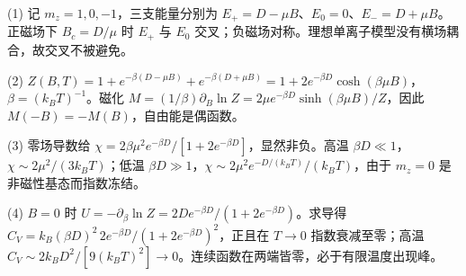(1) 记 \(m_z=1,0,-1\)，三支能量分别为 \(E_+=D-\mu B\)、\(E_0=0\)、\(E_-=D+\mu B\)。正磁场下 \(B_c=D/\mu\) 时 \(E_+\) 与 \(E_0\) 交叉；负磁场对称。理想单离子模型没有横场耦合，故交叉不被避免。

(2) \(Z(B,T)=1+e^{-\beta(D-\mu B)}+e^{-\beta(D+\mu B)}=1+2e^{-\beta D}\cosh(\beta\mu B)\)，\(\beta=(k_BT)^{-1}\)。磁化 \(M=(1/\beta)\partial_B\ln Z=2\mu e^{-\beta D}\sinh(\beta\mu B)/Z\)，因此 \(M(-B)=-M(B)\)，自由能是偶函数。

(3) 零场导数给 \(\boxed{\chi=2\beta\mu^2e^{-\beta D}/[1+2e^{-\beta D}]}\)，显然非负。高温 \(\beta D\ll1\)，\(\chi\sim2\mu^2/(3k_BT)\)；低温 \(\beta D\gg1\)，\(\chi\sim2\mu^2e^{-D/(k_BT)}/(k_BT)\)，由于 \(m_z=0\) 是非磁性基态而指数冻结。

(4) \(B=0\) 时 \(U=-\partial_\beta\ln Z=2De^{-\beta D}/(1+2e^{-\beta D})\)。求导得 \(\boxed{C_V=k_B(\beta D)^2\,2e^{-\beta D}/(1+2e^{-\beta D})^2}\)，正且在 \(T\to0\) 指数衰减至零；高温 \(C_V\sim2k_BD^2/[9(k_BT)^2]\to0\)。连续函数在两端皆零，必于有限温度出现峰。
